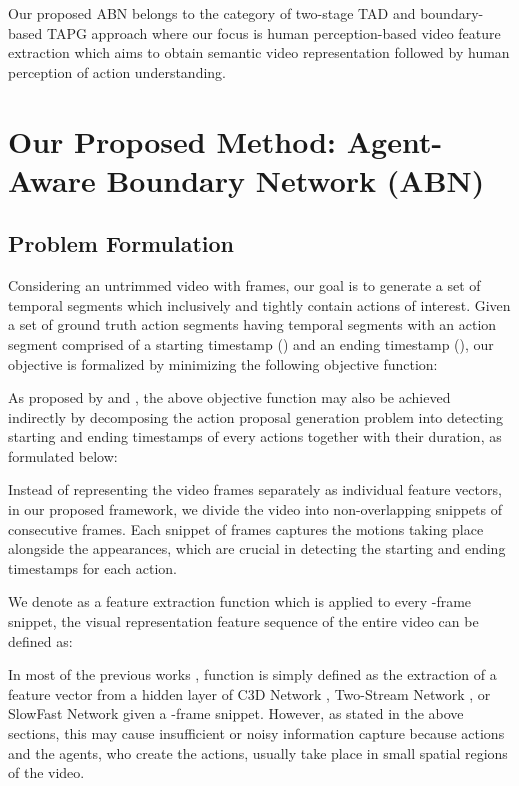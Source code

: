 \documentclass{ieeeaccess}
\begin{document}
Our proposed ABN belongs to the category of two-stage TAD and boundary-based TAPG approach where our focus is human perception-based video feature extraction which aims to obtain semantic video representation followed by human perception of action understanding. 

\section{Our Proposed Method: Agent-Aware Boundary Network (ABN)}

\subsection{Problem Formulation}
Considering an untrimmed video  with  frames, our goal is to generate a set of temporal segments which inclusively and tightly contain actions of interest. Given a set of ground truth action segments  having  temporal segments with an action segment comprised of a starting timestamp () and an ending timestamp (), our objective is formalized by minimizing the following objective function:


As proposed by \cite{lin2018bsn} and \cite{bmn}, the above objective function may also be achieved indirectly by decomposing the action proposal generation problem into detecting starting and ending timestamps of every actions together with their duration, as formulated below:




Instead of representing the video frames separately as individual feature vectors, in our proposed framework, we divide the video  into  non-overlapping snippets of  consecutive frames. Each snippet of  frames captures the motions taking place alongside the appearances, which are crucial in detecting the starting and ending timestamps for each action.

We denote  as a feature extraction function which is applied to every -frame snippet, the visual representation feature sequence  of the entire video  can be defined as:






In most of the previous works \cite{TCN, MSRA, Prop-SSAD, CTAP, SRG, lin2018bsn, liu2019multi, bmn, dbg}, function  is simply defined as the extraction of a feature vector from a hidden layer of C3D Network \cite{C3D_3}, Two-Stream Network \cite{2_stream_1}, or SlowFast Network \cite{SlowFast} given a -frame snippet. However, as stated in the above sections, this may cause insufficient or noisy information capture because actions and the agents, who create the actions, usually take place in small spatial regions of the video.
\end{document}
